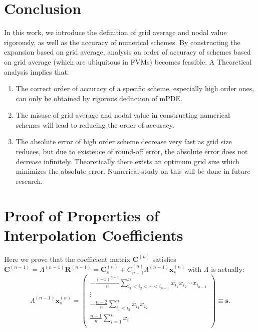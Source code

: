 \documentclass[]{article}
\def\Matrix#1{\left(#1\right)}
\def\Matrix#1{\left(#1\right)}
\begin{document}
\section{Conclusion} \label{sec:conclusion}

In this work, we introduce the definition of grid average and nodal
value rigorously, as well as the accuracy of numerical schemes. By
constructing the expansion based on grid average, analysis on order of
accuracy of schemes based on grid average (which are ubiquitous in
FVMs) becomes feasible. A Theoretical analysis implies that:
\begin{enumerate}
\item The correct order of accuracy of a specific scheme, especially
high order ones, can only be obtained by rigorous deduction of
mPDE.
\item The misuse of grid average and nodal value in constructing numerical
schemes will lead to reducing the order of accuracy. 
\item The absolute error of high order scheme decrease very fast as
grid size reduces, but due to existence of round-off error, the
absolute error does not decrease infinitely. Theoretically there
exists an optimum grid size which minimizes the absolute
error. Numerical study on this will be done in future research.

\end{enumerate}





\nocite{*}


\appendix
\section{Proof of Properties of Interpolation Coefficients}\label{sec:proof}
Here we prove that the coefficient matrix $\bm C^{(n)}$ satisfies
$\bm C^{(n-1)}=\Lambda^{(n-1)}\bm R^{(n-1)}=\bm C^{(n)}_s +
C^{(n)}_{n-1}\Lambda^{(n-1)}\bm x_s^{(n)}$ with $\Lambda$ is actually:
\begin{equation}
\Lambda^{(n-1)}\bm x_s^{(n)}=\Matrix{\begin{array}{r} \displaystyle -\frac{(-1)^{n-1}}{n}\sum_{i_1<i_2<\cdots<i_{n-1}}^n x_{i_1}x_{i_2}\cdots x_{i_{n-1}} \\ \vdots\hspace{1cm} \\ \displaystyle -\frac{n-2}{n}\sum_{i_1<i_2}^n x_{i_1}x_{i_2} \\[5mm] \displaystyle \frac{n-1}{n}\sum_{i=1}^n x_i \\ \end{array}}\equiv\bm s. \label{eq:appd-C-n-C-n1-s}
\end{equation}
\end{document}
